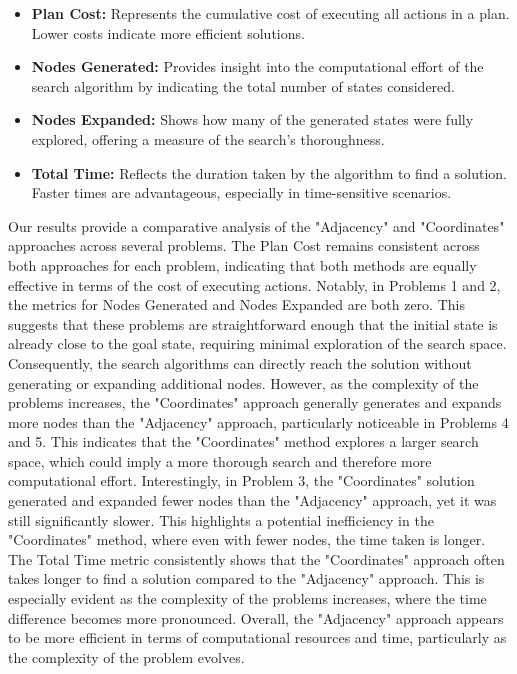 \documentclass{article}
\begin{document}
\begin{itemize}
    \item \textbf{Plan Cost:} Represents the cumulative cost of executing all actions in a plan. Lower costs indicate more efficient solutions.
    
    \item \textbf{Nodes Generated:} Provides insight into the computational effort of the search algorithm by indicating the total number of states considered.
    
    \item \textbf{Nodes Expanded:} Shows how many of the generated states were fully explored, offering a measure of the search's thoroughness.
    
    \item \textbf{Total Time:} Reflects the duration taken by the algorithm to find a solution. Faster times are advantageous, especially in time-sensitive scenarios.
\end{itemize}

Our results provide a comparative analysis of the "Adjacency" and "Coordinates" approaches across several problems. The Plan Cost remains consistent across both approaches for each problem, indicating that both methods are equally effective in terms of the cost of executing actions. Notably, in Problems 1 and 2, the metrics for Nodes Generated and Nodes Expanded are both zero. This suggests that these problems are straightforward enough that the initial state is already close to the goal state, requiring minimal exploration of the search space. Consequently, the search algorithms can directly reach the solution without generating or expanding additional nodes. However, as the complexity of the problems increases, the "Coordinates" approach generally generates and expands more nodes than the "Adjacency" approach, particularly noticeable in Problems 4 and 5. This indicates that the "Coordinates" method explores a larger search space, which could imply a more thorough search and therefore more computational effort. Interestingly, in Problem 3, the "Coordinates" solution generated and expanded fewer nodes than the "Adjacency" approach, yet it was still significantly slower. This highlights a potential inefficiency in the "Coordinates" method, where even with fewer nodes, the time taken is longer. The Total Time metric consistently shows that the "Coordinates" approach often takes longer to find a solution compared to the "Adjacency" approach. This is especially evident as the complexity of the problems increases, where the time difference becomes more pronounced. Overall, the "Adjacency" approach appears to be more efficient in terms of computational resources and time, particularly as the complexity of the problem evolves.
\end{document}
